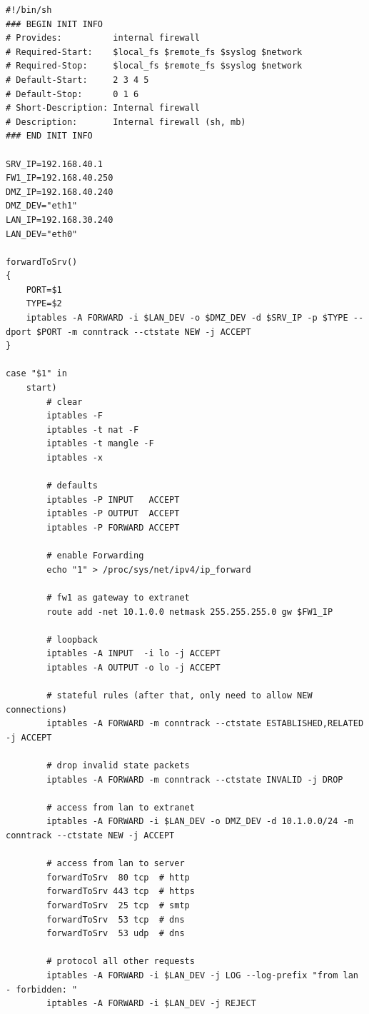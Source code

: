 \begin{lstlisting}[label=lst:masq,caption={Basisskript interne Firewall.}]
#!/bin/sh
### BEGIN INIT INFO
# Provides:          internal firewall
# Required-Start:    $local_fs $remote_fs $syslog $network
# Required-Stop:     $local_fs $remote_fs $syslog $network
# Default-Start:     2 3 4 5
# Default-Stop:      0 1 6
# Short-Description: Internal firewall
# Description:       Internal firewall (sh, mb)
### END INIT INFO

SRV_IP=192.168.40.1
FW1_IP=192.168.40.250
DMZ_IP=192.168.40.240
DMZ_DEV="eth1"
LAN_IP=192.168.30.240
LAN_DEV="eth0"

forwardToSrv()
{
    PORT=$1
    TYPE=$2
    iptables -A FORWARD -i $LAN_DEV -o $DMZ_DEV -d $SRV_IP -p $TYPE --dport $PORT -m conntrack --ctstate NEW -j ACCEPT
}

case "$1" in
    start)
        # clear
        iptables -F
        iptables -t nat -F
        iptables -t mangle -F
        iptables -x

        # defaults
        iptables -P INPUT   ACCEPT
        iptables -P OUTPUT  ACCEPT
        iptables -P FORWARD ACCEPT

        # enable Forwarding
        echo "1" > /proc/sys/net/ipv4/ip_forward

        # fw1 as gateway to extranet
        route add -net 10.1.0.0 netmask 255.255.255.0 gw $FW1_IP

        # loopback
        iptables -A INPUT  -i lo -j ACCEPT
        iptables -A OUTPUT -o lo -j ACCEPT

        # stateful rules (after that, only need to allow NEW connections)
        iptables -A FORWARD -m conntrack --ctstate ESTABLISHED,RELATED -j ACCEPT

        # drop invalid state packets
        iptables -A FORWARD -m conntrack --ctstate INVALID -j DROP

        # access from lan to extranet
        iptables -A FORWARD -i $LAN_DEV -o DMZ_DEV -d 10.1.0.0/24 -m conntrack --ctstate NEW -j ACCEPT

        # access from lan to server
        forwardToSrv  80 tcp  # http
        forwardToSrv 443 tcp  # https
        forwardToSrv  25 tcp  # smtp
        forwardToSrv  53 tcp  # dns
        forwardToSrv  53 udp  # dns

        # protocol all other requests
        iptables -A FORWARD -i $LAN_DEV -j LOG --log-prefix "from lan - forbidden: "
        iptables -A FORWARD -i $LAN_DEV -j REJECT


\end{lstlisting}
